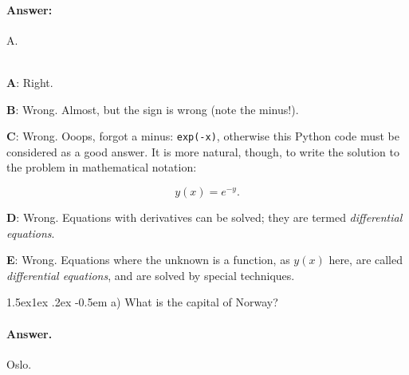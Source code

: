 \documentclass[%
oneside,                 %
final,                   %
10pt]{article}
\makeatletter
\newenvironment{doconcequiz}{}{}
\newenvironment{doconceexercise}{}{}
\newcounter{doconceexercisecounter}
\newcommand\subex{\@startsection{paragraph}{4}{\z@}%
                  {1.5ex\@plus1ex \@minus.2ex}%
                  {-0.5em}%
                  {\normalfont\normalsize\bfseries}}
\theoremstyle{definition}
\makeatother
\begin{document}
\begin{enumerate}
\begin{doconceexercise}
\begin{doconcequiz}
\paragraph{Answer:} A.

\\


\textbf{A}: Right. 

\textbf{B}: Wrong. Almost, but the sign is wrong (note the minus!).

\textbf{C}: Wrong. Ooops, forgot a minus: \texttt{exp(-x)}, otherwise this Python code
must be considered as a good answer. It is more natural,
though, to write the solution to the problem
in mathematical notation:

\[ y(x) = e^{-y}.\]

\textbf{D}: Wrong. Equations with derivatives can be solved;
they are termed \emph{differential
equations}.

\textbf{E}: Wrong. Equations where the unknown is a function, as $y(x)$
here, are called \emph{differential equations}, and are solved by
special techniques.




\vspace{3mm}

\end{doconcequiz}



\end{doconceexercise}

\begin{doconceexercise}

                             


\subex{a)}
What is the capital of Norway?

\paragraph{Answer.}
Oslo.

\end{doconceexercise}


\end{enumerate}
\end{document}
